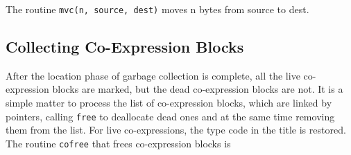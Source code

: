 The routine \texttt{mvc(n, source, dest)} moves n bytes from source to dest.

\subsection{Collecting Co-Expression Blocks}

After the location phase of garbage collection is complete, all the
live co-expression blocks are marked, but the dead co-expression
blocks are not. It is a simple matter to process the list of
co-expression blocks, which are linked by pointers, calling \texttt{free} to
deallocate dead ones and at the same time removing them from the
list. For live co-expressions, the type code in the title is
restored. The routine \texttt{cofree} that frees co-expression blocks is

